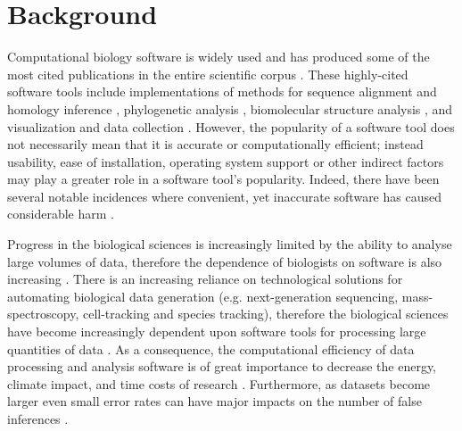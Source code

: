 \documentclass{bmcart}
\begin{document}


\section*{Background}
Computational biology software is widely used and has produced some of
the most cited publications in the entire scientific corpus
\cite{Perez-Iratxeta2007-lv,Van_Noorden2014-kc,Wren2016-xy}. These
highly-cited software tools include implementations of methods for sequence
alignment and homology inference \cite{Altschul1990-ht,Thompson1994-eu,Thompson1997-rl,Altschul1997-ga},
phylogenetic analysis \cite{Felsenstein1985-lj,Saitou1987-zl,Posada1998-qq,Ronquist2003-yh,Tamura2007-ei}, 
biomolecular structure analysis \cite{Sheldrick1990-kc,Sheldrick2008-xy,Jones1991-ik,Laskowski1993-vi,Otwinowski1997-xj}, and
visualization and data collection \cite{Kraulis1991-lt,Berman2000-to}. 
However, the popularity of a
software tool does not necessarily mean that it is accurate or
computationally efficient{\color{red};} instead usability, ease of installation,
operating system support or other indirect factors may play a greater role in a software
tool's popularity. Indeed, there have been several notable incidences where
convenient, yet inaccurate software has caused considerable harm
\cite{leveson1993investigation,cummings2020regulating,Herkert:2020}.

Progress in the biological sciences is increasingly limited by the
ability to analyse large volumes of data, therefore the
dependence of biologists on software is also increasing
\cite{Marx2013-zi}. There is an increasing reliance on technological
solutions for automating biological data generation
(e.g. next-generation sequencing, mass-spectroscopy, cell-tracking and
species tracking), therefore the biological sciences have become
increasingly dependent upon software tools for processing
large quantities of data \cite{Marx2013-zi}. As a consequence, the
computational efficiency of data processing and analysis software is
of great importance to decrease the energy, climate impact, and time costs of research
\cite{Gombiner2011-md}. Furthermore,  as datasets become
larger even small error rates can have
major impacts on the number of false inferences \cite{Storey2003-cv}.
\end{document}

